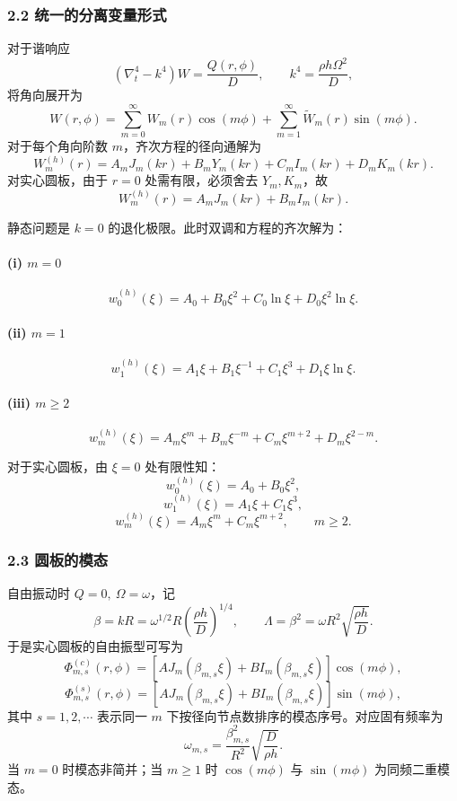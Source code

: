 \documentclass[12pt]{ctexart}
\begin{document}
\subsubsection*{2.2 统一的分离变量形式}
对于谐响应
\[
\left(\nabla_t^4-k^4\right)W=\frac{Q(r,\phi)}{D},
\qquad
k^4=\frac{\rho h \Omega^2}{D},
\]
将角向展开为
\[
W(r,\phi)=\sum_{m=0}^\infty W_m(r)\cos(m\phi)
+\sum_{m=1}^\infty \widetilde W_m(r)\sin(m\phi).
\]
对于每个角向阶数 \(m\)，齐次方程的径向通解为
\[
W_m^{(h)}(r)
=
A_m J_m(kr)+B_m Y_m(kr)+C_m I_m(kr)+D_m K_m(kr).
\]
对实心圆板，由于 \(r=0\) 处需有限，必须舍去 \(Y_m,K_m\)，故
\[
W_m^{(h)}(r)=A_m J_m(kr)+B_m I_m(kr).
\]

静态问题是 \(k=0\) 的退化极限。此时双调和方程的齐次解为：

\paragraph{(i) \(m=0\)}
\[
w_0^{(h)}(\xi)=A_0+B_0\xi^2+C_0\ln\xi+D_0\xi^2\ln\xi.
\]

\paragraph{(ii) \(m=1\)}
\[
w_1^{(h)}(\xi)=A_1\xi+B_1\xi^{-1}+C_1\xi^3+D_1\xi\ln\xi.
\]

\paragraph{(iii) \(m\ge 2\)}
\[
w_m^{(h)}(\xi)=A_m\xi^m+B_m\xi^{-m}+C_m\xi^{m+2}+D_m\xi^{2-m}.
\]

对于实心圆板，由 \(\xi=0\) 处有限性知：
\[
w_0^{(h)}(\xi)=A_0+B_0\xi^2,
\]
\[
w_1^{(h)}(\xi)=A_1\xi+C_1\xi^3,
\]
\[
w_m^{(h)}(\xi)=A_m\xi^m+C_m\xi^{m+2},\qquad m\ge 2.
\]

\subsubsection*{2.3 圆板的模态}
自由振动时 \(Q=0,\ \Omega=\omega\)，记
\[
\beta=kR=\omega^{1/2}R\left(\frac{\rho h}{D}\right)^{1/4},
\qquad
\Lambda=\beta^2=\omega R^2\sqrt{\frac{\rho h}{D}}.
\]
于是实心圆板的自由振型可写为
\[
\Phi_{m,s}^{(c)}(r,\phi)
=
\left[A J_m(\beta_{m,s}\xi)+B I_m(\beta_{m,s}\xi)\right]\cos(m\phi),
\]
\[
\Phi_{m,s}^{(s)}(r,\phi)
=
\left[A J_m(\beta_{m,s}\xi)+B I_m(\beta_{m,s}\xi)\right]\sin(m\phi),
\]
其中 \(s=1,2,\cdots\) 表示同一 \(m\) 下按径向节点数排序的模态序号。对应固有频率为
\[
\omega_{m,s}
=
\frac{\beta_{m,s}^2}{R^2}\sqrt{\frac{D}{\rho h}}.
\]
当 \(m=0\) 时模态非简并；当 \(m\ge 1\) 时 \(\cos(m\phi)\) 与 \(\sin(m\phi)\) 为同频二重模态。
\end{document}
